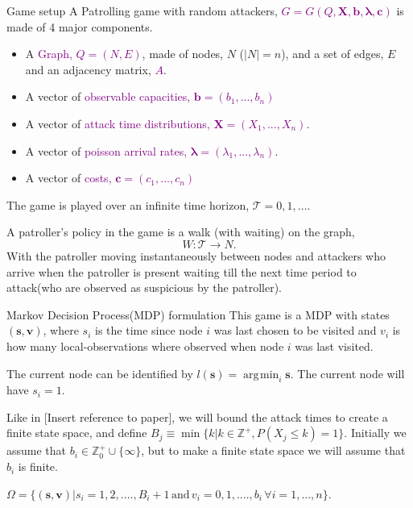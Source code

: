 \documentclass[10pt]{beamer}
\DeclareMathOperator*{\argmin}{\arg\!\min}
\begin{document}
\begin{frame}{Game setup}
A Patrolling game with random attackers, \textcolor{purple}{$G=G(Q,\bm{X},\bm{b},\bm{\lambda},\bm{c})$} is made of 4 major components.
\begin{itemize}
\item A \textcolor{purple}{Graph, $Q=(N,E)$}, made of nodes, $N$ ($|N|=n$), and a set of edges, $E$ and an adjacency matrix, \textcolor{purple}{$A$}.
\item A vector of \textcolor{purple}{observable capacities, $\bm{b}=(b_{1},...,b_{n})$}
\item A vector of \textcolor{purple}{attack time distributions, $\bm{X}=(X_{1},...,X_{n})$}.
\item A vector of \textcolor{purple}{poisson arrival rates, $\bm{\lambda}=(\lambda_{1},...,\lambda_{n})$}.
\item A vector of \textcolor{purple}{costs, $\bm{c}=(c_{1},...,c_{n})$}
\end{itemize}

\pause

The game is played over an infinite time horizon, $\mathcal{T}={0,1,....}$

A patroller's policy in the game is a walk (with waiting) on the graph,
$$W: \mathcal{T} \rightarrow N .$$
With the patroller moving instantaneously between nodes and attackers who arrive when the patroller is present waiting till the next time period to attack(who are observed as suspicious by the patroller).
\end{frame}

\begin{frame}{Markov Decision Process(MDP) formulation}
This game is a MDP with states $(\bm{s},\bm{v})$, where $s_{i}$ is the time since node $i$ was last chosen to be visited and $v_{i}$ is how many local-observations where observed when node $i$ was last visited.

The current node can be identified by $l(\bm{s})=\argmin_{i} \bm{s}$. The current node will have $s_{i}=1$.

Like in [Insert reference to paper], we will bound the attack times to create a finite state space, and define $B_{j} \equiv \min \{ k | k \in \mathbb{Z}^{+} , P(X_{j} \leq k)=1 \}$. Initially we assume that $b_{i} \in \mathbb{Z}^{+}_{0} \cup \{\infty\}$, but to make a finite state space we will assume that $b_{i}$ is finite.

$\Omega=\{(\bm{s},\bm{v}) | s_{i}=1,2,....,B_{i}+1 \, \text{and}  \, v_{i}=0,1,....,b_{i} \, \forall i=1,...,n  \}$.

\end{frame}
\end{document}
